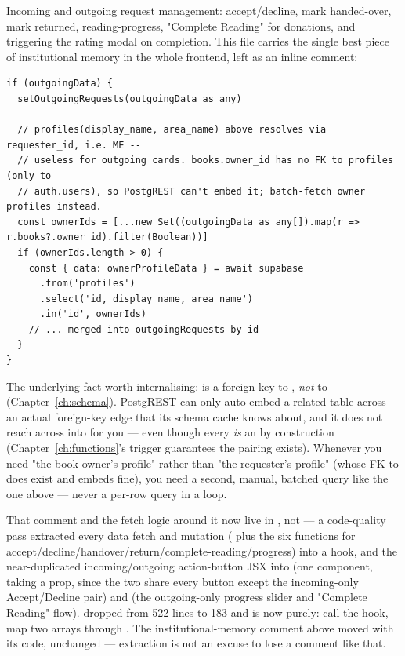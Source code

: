 Incoming and outgoing request management: accept/decline, mark handed-over, mark returned, reading-progress, "Complete Reading" for donations, and triggering the rating modal on completion. This file carries the single best piece of institutional memory in the whole frontend, left as an inline comment:

\begin{lstlisting}[caption={app/(dashboard)/requests/page.tsx — a bug fix explained in-place}]
if (outgoingData) {
  setOutgoingRequests(outgoingData as any)

  // profiles(display_name, area_name) above resolves via requester_id, i.e. ME --
  // useless for outgoing cards. books.owner_id has no FK to profiles (only to
  // auth.users), so PostgREST can't embed it; batch-fetch owner profiles instead.
  const ownerIds = [...new Set((outgoingData as any[]).map(r => r.books?.owner_id).filter(Boolean))]
  if (ownerIds.length > 0) {
    const { data: ownerProfileData } = await supabase
      .from('profiles')
      .select('id, display_name, area_name')
      .in('id', ownerIds)
    // ... merged into outgoingRequests by id
  }
}
\end{lstlisting}

The underlying fact worth internalising:  is a foreign key to , \emph{not} to  (Chapter~\ref{ch:schema}). PostgREST can only auto-embed a related table across an actual foreign-key edge that its schema cache knows about, and it does not reach across  into  for you — even though every  \emph{is} an  by construction (Chapter~\ref{ch:functions}'s  trigger guarantees the pairing exists). Whenever you need "the book owner's profile" rather than "the requester's profile" (whose FK to  does exist and embeds fine), you need a second, manual, batched query like the one above — never a per-row query in a loop.

\begin{olknote}
That comment and the fetch logic around it now live in , not  — a code-quality pass extracted every data fetch and mutation ( plus the six  functions for accept/decline/handover/return/complete-reading/progress) into a  hook, and the near-duplicated incoming/outgoing action-button JSX into  (one component, taking a  prop, since the two share every button except the incoming-only Accept/Decline pair) and  (the outgoing-only progress slider and "Complete Reading" flow).  dropped from 522 lines to 183 and is now purely: call the hook, map two arrays through . The institutional-memory comment above moved with its code, unchanged — extraction is not an excuse to lose a comment like that.
\end{olknote}

